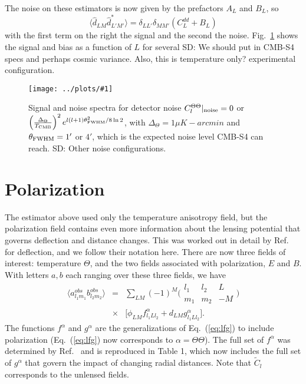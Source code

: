\documentclass[prl,amsmath,amssymb,floatfix,superscriptaddress,nofootinbib,twocolumn]{revtex4-1}
\def\be{\begin{equation}}
\def\ee{\end{equation}}
\def\bea{\begin{eqnarray}}
\def\eea{\end{eqnarray}}
\newcommand{\ec}[1]{Eq.~(\ref{eq:#1})}
\newcommand{\sfig}[2]{
\texttt{[image: ../plots/\#1]}
        }
\newcommand{\Spng}[2]{
   \begin{figure}[thbp]
   \begin{center}
    \sfig{#1.png}{\columnwidth}
    \caption{{\small #2}}
    \label{fig:#1}
     \end{center}
   \end{figure}
}
\newcommand{\rf}[1]{\ref{fig:#1}}
\newcommand{\scott}[1]{{\color{darkgreen} SD: #1}}
\begin{document}
The noise on these estimators is now given by the prefactors $A_L$ and $B_L$, so  
\be
\langle \hat d_{LM} \hat d^*_{L'M'}  \rangle = \delta_{LL'}\delta_{MM'} \left( C_L^{dd} + B_L \right)
\ee
with the first term on the right the signal and the second the noise. Fig.~\rf{Delay} shows the signal and bias as a function of $L$ for several \scott{We should put in CMB-S4 specs and perhaps cosmic variance. Also, this is temperature only?} experimental configuration.
\Spng{Delay}{Signal and noise spectra for detector noise $C_{l}^{\Theta \Theta}|_{\rm noise} = 0$ or $\left(\frac{\Delta_{\Theta}}{T_{\rm CMB}} \right)^{2} e^{l(l+1)\theta_{\rm FWHM}^{2}/8 \, \rm ln \,2}$, with $\Delta_{\Theta}=1\mu K-arcmin$ and $\theta_{\rm FWHM}=1'$ or $4'$, which is the expected noise level CMB-S4 can reach. \scott{Other noise configurations.}}

\section{Polarization}

The estimator above used only the temperature anisotropy field, but the polarization field contains even more information about the lensing potential that governs deflection and distance changes. This was worked out in detail by Ref.~\cite{Okamoto:2003zw} for deflection, and we follow their notation here. There are now three fields of interest: temperature $\Theta$, and the two fields associated with polarization, $E$ and $B$. With letters $a,b$ each ranging over these three fields, we have 
\bea
\langle a^{obs}_{l_{1}m_{1}}b^{obs}_{l_{2}m_{2}}\rangle &=& \sum_{LM}(-1)^{M}\bigl(\begin{smallmatrix} l_1 & l_2 & L \\ m_1 & m_2 & -M  \end{smallmatrix}\bigr)\nonumber \\
&\times&
\big[ \phi_{LM}f^{\alpha}_{l_{1}Ll_{2}} + d_{LM}g^{\alpha}_{l_{1}Ll_{2}} \big] 
.\eea
The functions $f^\alpha$ and $g^\alpha$ are the generalizations of \ec{lfg} to include polarization (\ec{lfg} now corresponds to $\alpha=\Theta\Theta$). The full set of $f^{\alpha}$ was determined by Ref.~\cite{Okamoto:2003zw} and is reproduced in Table 1, which now includes the full set of $g^{\alpha}$ that govern the impact of changing radial distances. Note that $\tilde C_l$ corresponds to the unlensed fields.
\end{document}
